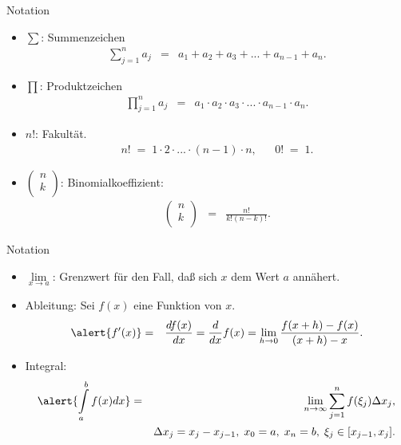 \documentclass[german]{beamer}
\newcommand{\bq}{\begin{eqnarray*}}
\newcommand{\eq}{\end{eqnarray*}}
\begin{document}
\begin{frame}{Notation}

\begin{itemize}

\item 
\alert{$\sum$}: Summenzeichen 
{\small
\bq
 \sum\limits_{j=1}^n a_j & = & a_1 + a_2 + a_3 + ... + a_{n-1} + a_{n}.
\eq
}
\pause

\item 
\alert{$\prod$}: Produktzeichen
{\small
\bq
 \prod\limits_{j=1}^n a_j & = & a_1 \cdot a_2 \cdot a_3 \cdot ... \cdot a_{n-1} \cdot a_{n}.
\eq
}
\pause

\item
\alert{$n!$}: Fakult\"at. 
{\small
\bq
 n! \; = \; 1 \cdot 2 \cdot ... \cdot (n-1) \cdot n,
 & &
 0! \; = \; 1. 
\eq
}
\pause

\item
\alert{$\left( \begin{array}{c} n \\ k \\ \end{array} \right)$}:
Binomialkoeffizient:
{\small
\bq
 \left( \begin{array}{c} n \\ k \\ \end{array} \right)
 & = & \frac{n!}{k!(n-k)!}.
\eq
}

\end{itemize}

\end{frame}

\begin{frame}{Notation}

\begin{itemize}

\item
\alert{$\lim\limits_{x\rightarrow a}$}: Grenzwert f\"ur den Fall, da{\ss} sich $x$ dem Wert $a$ ann\"ahert.
\pause

\item 
Ableitung: Sei $f(x)$ eine Funktion von $x$.
{\small
\bq
 \alert{f'(x)} & = & \frac{df(x)}{dx} = \frac{d}{dx} f(x) = \lim\limits_{h\rightarrow 0} \frac{f(x+h)-f(x)}{(x+h)-x}.
\eq
}
\pause

\item
Integral:
{\small
\bq
 \alert{\int\limits_a^b f(x) dx} & = & \lim\limits_{n\rightarrow\infty} \sum\limits_{j=1}^n f(\xi_j) \Delta x_j,
 \nonumber \\
 & &
 \Delta x_j = x_j - x_{j-1}, \; x_0=a, \; x_n=b, \; \xi_j\in[x_{j-1},x_j].
\eq
}

\end{itemize}

\end{frame}
\end{document}

